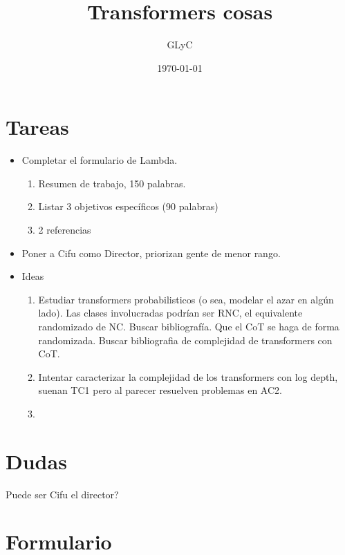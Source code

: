 \documentclass{article}
\title{Transformers cosas}
\author{GLyC}
\date{\today}
\begin{document}
\maketitle

\section{Tareas}

\begin{itemize}
    \item Completar el formulario de Lambda.

    \begin{enumerate}
        \item Resumen de trabajo, 150 palabras.
        \item Listar 3 objetivos específicos (90 palabras)
        \item 2 referencias
    \end{enumerate}

    \item Poner a Cifu como Director, priorizan gente de menor rango.

    \item Ideas
    
    \begin{enumerate}
        \item Estudiar transformers probabilisticos (o sea, modelar el azar en algún lado). Las clases involucradas podrían ser RNC, el equivalente randomizado de NC. Buscar bibliografía. Que el CoT se haga de forma randomizada. Buscar bibliografia de complejidad de transformers con CoT.

        \item Intentar caracterizar la complejidad de los transformers con log depth, suenan TC1 pero al parecer resuelven problemas en AC2.

        \item 
    \end{enumerate}
\end{itemize}

\section{Dudas}

Puede ser Cifu el director?

\section{Formulario}
\end{document}
